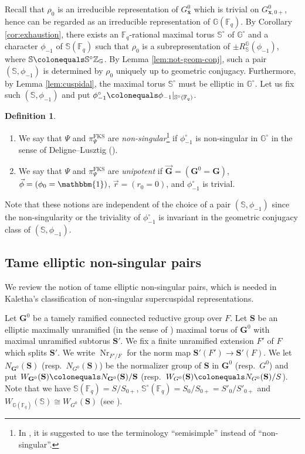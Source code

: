 \documentclass{amsart}
\newcommand{\FKS}{\mathrm{FKS}}
\newcommand{\x}{\mathbf{x}}
\newcommand{\F}{\mathbb{F}}
\newcommand{\bbS}{\mathbb{S}}
\newcommand{\bbG}{\mathbb{G}}
\newcommand{\bfG}{\mathbf{G}}
\newcommand{\bbZ}{\mathbb{Z}}
\newcommand{\bfS}{\mathbf{S}}
\DeclareMathOperator{\Nr}{Nr}
\theoremstyle{plain}
\theoremstyle{definition}
\newtheorem{defn}[thm]{Definition}
\theoremstyle{remark}
\theoremstyle{theorem}
\begin{document}
Recall that $\rho_{0}$ is an irreducible representation of $G^{0}_{\bar{\x}}$ which is trivial on $G^{0}_{\x,0+}$, hence can be regarded as an irreducible representation of $\bbG(\F_{q})$.
By Corollary \ref{cor:exhaustion}, there exists an $\F_{q}$-rational maximal torus $\bbS^{\circ}$ of $\bbG^{\circ}$ and a character $\phi_{-1}$ of $\bbS(\F_{q})$ such that $\rho_{0}$ is a subrepresentation of $\pm R_{\bbS}^{\bbG}(\phi_{-1})$, where $\bbS\colonequals \bbS^{\circ}\bbZ_{\bbG}$.
By Lemma \ref{lem:not-geom-conj}, such a pair $(\bbS,\phi_{-1})$ is determined by $\rho_{0}$ uniquely up to geometric conjugacy.
Furthermore, by Lemma \ref{lem:cuspidal}, the maximal torus $\bbS^\circ$ must be elliptic in $\bbG^\circ$.
Let us fix such $(\bbS,\phi_{-1})$ and put $\phi_{-1}^{\circ}\colonequals \phi_{-1}|_{\bbS^{\circ}(\F_{q})}$.

\begin{defn}\label{def:ss and unip}
\begin{enumerate}
\item
We say that $\Psi$ and $\pi_{\Psi}^{\FKS}$ are \textit{non-singular}\footnote{In \cite[Section 1.2]{Kal22-ICM}, it is suggested to use the terminology ``semisimple'' instead of ``non-singular''.} if $\phi_{-1}^{\circ}$ is non-singular in $\bbG^{\circ}$ in the sense of Deligne--Lusztig (\cite[Definition 5.15]{DL76}).
\item
We say that $\Psi$ and $\pi_{\Psi}^{\FKS}$ are \textit{unipotent} if $\vec{\bfG}=(\bfG^{0}=\bfG)$, $\vec{\phi}=(\phi_{0}=\mathbbm{1})$, $\vec{r}=(r_{0}=0)$, and $\phi_{-1}^{\circ}$ is trivial.
\end{enumerate}
Note that these notions are independent of the choice of a pair $(\bbS,\phi_{-1})$ since the non-singularity or the triviality of $\phi_{-1}^{\circ}$ is invariant in the geometric conjugacy class of $(\bbS,\phi_{-1})$.
\end{defn}

\subsection{Tame elliptic non-singular pairs}\label{subsec:TENSP}
We review the notion of tame elliptic non-singular pairs, which is needed in Kaletha's classification of non-singular supercuspidal representations.

Let $\bfG^{0}$ be a tamely ramified connected reductive group over $F$.
Let $\bfS$ be an elliptic maximally unramified (in the sense of \cite[Definition 3.4.2]{Kal19}) maximal torus of $\bfG^{0}$ with maximal unramified subtorus $\bfS'$.
We fix a finite unramified extension $F'$ of $F$ which splits $\bfS'$.
We write $\Nr_{F'/F}$ for the norm map $\bfS'(F')\rightarrow\bfS'(F)$.
We let $N_{\bfG^{0}}(\bfS)$ (resp.\ $N_{G^{0}}(\bfS)$) be the normalizer group of $\bfS$ in $\bfG^{0}$ (resp.\ $G^{0}$) and put $W_{\bfG^{0}}(\bfS)\colonequals N_{\bfG^{0}}(\bfS)/\bfS$ (resp.\ $W_{G^{0}}(\bfS)\colonequals N_{G^{0}}(\bfS)/S$).
Note that we have $\bbS(\F_{q})=S/S_{0+}$, $\bbS^{\circ}(\F_{q})=S_{0}/S_{0+}=S'_{0}/S'_{0+}$ and $W_{\bbG(\F_{q})}(\bbS)\cong W_{G^{0}}(\bfS)$ (see \cite[Lemma 3.2.2]{Kal19-sc}).
\end{document}
